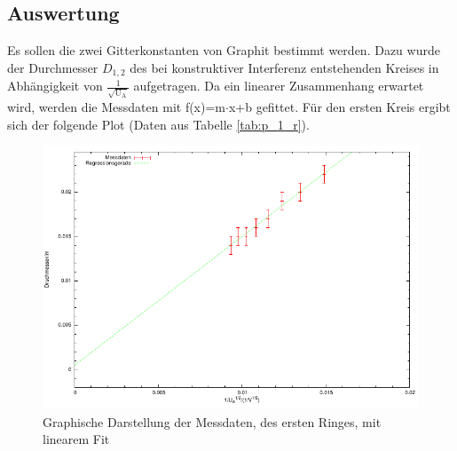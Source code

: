 \documentclass[12pt,a4paper]{article}
\begin{document}
\subsection{Auswertung}

Es sollen die zwei Gitterkonstanten von Graphit bestimmt werden. Dazu wurde der Durchmesser $D_{1,2}$ des bei konstruktiver Interferenz entstehenden Kreises in Abhängigkeit von $\frac{1}{\sqrt{\text{U}_{\text{A}}}}$ aufgetragen. Da ein linearer Zusammenhang erwartet wird, werden die Messdaten mit f(x)=m$\cdot$x+b gefittet.
Für den ersten Kreis ergibt sich der folgende Plot (Daten aus Tabelle \ref{tab:p_1_r}).

\begin{figure}[H] 
  \centering
    \includegraphics[scale = 1]{kreis_1.pdf}
  	\caption[Graphische Darstellung der Messdaten, des ersten Ringes, mit linearem Fit]{Graphische Darstellung der Messdaten, des ersten Ringes, mit linearem Fit}
  \label{fig:plot_1}
\end{figure}
\end{document}
